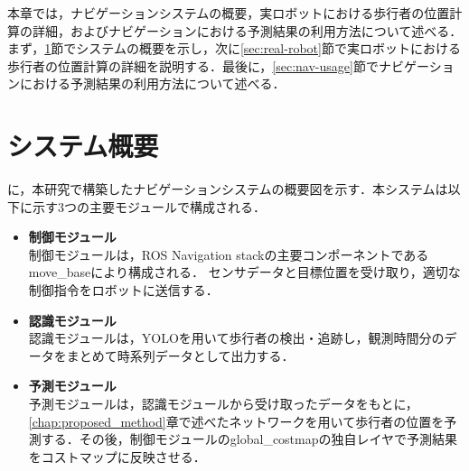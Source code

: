 
\vspace{-20pt}


本章では，ナビゲーションシステムの概要，実ロボットにおける歩行者の位置計算の詳細，およびナビゲーションにおける予測結果の利用方法について述べる．まず，\ref{sec:nav-sys}節でシステムの概要を示し，次に\ref{sec:real-robot}節で実ロボットにおける歩行者の位置計算の詳細を説明する．最後に，\ref{sec:nav-usage}節でナビゲーションにおける予測結果の利用方法について述べる．


\section{システム概要}\label{sec:nav-sys}
に，本研究で構築したナビゲーションシステムの概要図を示す．本システムは以下に示す3つの主要モジュールで構成される．

\begin{itemize}
  \item \textbf{制御モジュール} \\
  制御モジュールは，ROS Navigation stackの主要コンポーネントであるmove\_baseにより構成される．
  センサデータと目標位置を受け取り，適切な制御指令をロボットに送信する．
  \item \textbf{認識モジュール} \\
  認識モジュールは，YOLOを用いて歩行者の検出・追跡し，観測時間分のデータをまとめて時系列データとして出力する．
  \item \textbf{予測モジュール} \\
  予測モジュールは，認識モジュールから受け取ったデータをもとに，\ref{chap:proposed_method}章で述べたネットワークを用いて歩行者の位置を予測する．その後，制御モジュールのglobal\_costmapの独自レイヤで予測結果をコストマップに反映させる．
\end{itemize}




